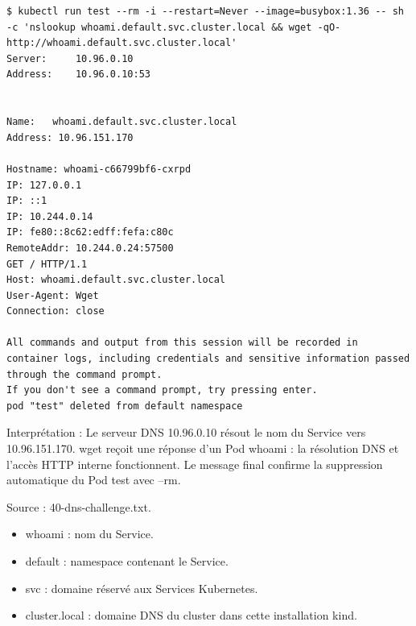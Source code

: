 \documentclass[11pt,a4paper]{article}
\begin{document}
\par\medskip\noindent\begin{minipage}{\linewidth}
\par\vspace{4pt}\noindent\begin{minipage}{\linewidth}
\begin{Verbatim}[breaklines=true,breakanywhere=true,fontsize=\footnotesize,frame=single,framesep=8pt,rulecolor=\color{teal}]
$ kubectl run test --rm -i --restart=Never --image=busybox:1.36 -- sh -c 'nslookup whoami.default.svc.cluster.local && wget -qO- http://whoami.default.svc.cluster.local'
Server:     10.96.0.10
Address:    10.96.0.10:53


Name:   whoami.default.svc.cluster.local
Address: 10.96.151.170

Hostname: whoami-c66799bf6-cxrpd
IP: 127.0.0.1
IP: ::1
IP: 10.244.0.14
IP: fe80::8c62:edff:fefa:c80c
RemoteAddr: 10.244.0.24:57500
GET / HTTP/1.1
Host: whoami.default.svc.cluster.local
User-Agent: Wget
Connection: close

All commands and output from this session will be recorded in container logs, including credentials and sensitive information passed through the command prompt.
If you don't see a command prompt, try pressing enter.
pod "test" deleted from default namespace
\end{Verbatim}
\end{minipage}\par\vspace{6pt}

Interprétation : Le serveur DNS 10.96.0.10 résout le nom du Service vers 10.96.151.170. wget reçoit une réponse d'un Pod whoami : la résolution DNS et l'accès HTTP interne fonctionnent. Le message final confirme la suppression automatique du Pod test avec --rm.

{\footnotesize\color{teal} Source : 40-dns-challenge.txt.\par}
\end{minipage}\par\medskip

\begin{itemize}
\item whoami : nom du Service.
\item default : namespace contenant le Service.
\item svc : domaine réservé aux Services Kubernetes.
\item cluster.local : domaine DNS du cluster dans cette installation kind.
\end{itemize}
\end{document}
